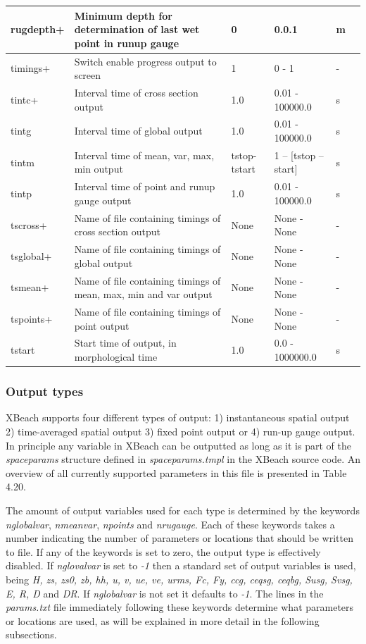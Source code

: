 \documentclass{article}
\begin{document}
\begin{tabular}{|p{0.8in}|p{1.0in}|p{0.6in}|p{0.7in}|p{0.5in}|p{0.6in}|}
rugdepth+ & Minimum depth for determination of last wet point in runup gauge & 0 & 0.0.1 & m &  \\ \hline 
timings+ & Switch enable progress output to screen & 1 & 0 - 1 & - &  \\ \hline 
tintc+ & Interval time of cross section output & 1.0 & 0.01 - 100000.0 & s &  \\ \hline 
tintg & Interval time of global output & 1.0 & 0.01 - 100000.0 & s &  \\ \hline 
tintm & Interval time of mean, var, max, min output & tstop- tstart & 1 -- [tstop -- start] & s &  \\ \hline 
tintp & Interval time of point and runup gauge output & 1.0 & 0.01 - 100000.0 & s &  \\ \hline 
tscross+ & Name of file containing timings of cross section output & None & None - None & - &  \\ \hline 
tsglobal+ & Name of file containing timings of global output & None & None - None & - &  \\ \hline 
tsmean+ & Name of file containing timings of mean, max, min and var output & None & None - None & - &  \\ \hline 
tspoints+ & Name of file containing timings of point output & None & None - None & - &  \\ \hline 
tstart & Start time of output, in morphological time & 1.0 & 0.0 - 1000000.0 & s &  \\ \hline 
\end{tabular}


\subsubsection{ Output types}

\noindent XBeach supports four different types of output: 1) instantaneous spatial output 2) time-averaged spatial output 3) fixed point output or 4) run-up gauge output. In principle any variable in XBeach can be outputted as long as it is part of the \textit{spaceparams} structure defined in \textit{spaceparams.tmpl} in the XBeach source code. An overview of all currently supported parameters in this file is presented in Table 4.20.

\noindent The amount of output variables used for each type is determined by the keywords \textit{nglobalvar}, \textit{nmeanvar}, \textit{npoints} and \textit{nrugauge}. Each of these keywords takes a number indicating the number of parameters or locations that should be written to file. If any of the keywords is set to zero, the output type is effectively disabled. If \textit{nglovalvar} is set to \textit{-1} then a standard set of output variables is used, being \textit{H, zs, zs0, zb, hh, u, v, ue, ve, urms, Fc, Fy, ccg, ceqsg, ceqbg, Susg, Svsg, E, R, D} and \textit{DR}. If \textit{nglobalvar} is not set it defaults to \textit{-1}. The lines in the \textit{params.txt} file immediately following these keywords determine what parameters or locations are used, as will be explained in more detail in the following subsections.
\end{document}

